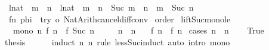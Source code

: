 \begin{isabellebody}
\ \ {\isacharparenleft}{\kern0pt}{\isachardoublequoteopen}{\isacharparenleft}{\kern0pt}l{\isacharcolon}{\kern0pt}{\isacharcolon}{\kern0pt}nat{\isacharparenright}{\kern0pt}\ {\isacharplus}{\kern0pt}\ m\ {\isacharminus}{\kern0pt}\ n{\isachardoublequoteclose}\ {\isacharbar}{\kern0pt}\ {\isachardoublequoteopen}{\isacharparenleft}{\kern0pt}l{\isacharcolon}{\kern0pt}{\isacharcolon}{\kern0pt}nat{\isacharparenright}{\kern0pt}\ {\isacharminus}{\kern0pt}\ {\isacharparenleft}{\kern0pt}m\ {\isacharplus}{\kern0pt}\ n{\isacharparenright}{\kern0pt}{\isachardoublequoteclose}\ {\isacharbar}{\kern0pt}\ {\isachardoublequoteopen}Suc\ m\ {\isacharminus}{\kern0pt}\ n{\isachardoublequoteclose}\ {\isacharbar}{\kern0pt}\ {\isachardoublequoteopen}m\ {\isacharminus}{\kern0pt}\ Suc\ n{\isachardoublequoteclose}{\isacharparenright}{\kern0pt}\ {\isacharequal}{\kern0pt}\isanewline
\ \ {\isacartoucheopen}fn\ phi\ {\isacharequal}{\kern0pt}{\isachargreater}{\kern0pt}\ try\ o\ Nat{\isacharunderscore}{\kern0pt}Arith{\isachardot}{\kern0pt}cancel{\isacharunderscore}{\kern0pt}diff{\isacharunderscore}{\kern0pt}conv{\isacartoucheclose}%
\endisatagML
{\isafoldML}%
%
\isadelimML
\isanewline
%
\endisadelimML
\isanewline
{}\isamarkupfalse%
\ order\isanewline
{}\isanewline
\isanewline
{}\isamarkupfalse%
\ lift{\isacharunderscore}{\kern0pt}Suc{\isacharunderscore}{\kern0pt}mono{\isacharunderscore}{\kern0pt}le{\isacharcolon}{\kern0pt}\isanewline
\ \ \ mono{\isacharcolon}{\kern0pt}\ {\isachardoublequoteopen}{\isasymAnd}n{\isachardot}{\kern0pt}\ f\ n\ {\isasymle}\ f\ {\isacharparenleft}{\kern0pt}Suc\ n{\isacharparenright}{\kern0pt}{\isachardoublequoteclose}\isanewline
\ \ \ \ \ {\isachardoublequoteopen}n\ {\isasymle}\ n{\isacharprime}{\kern0pt}{\isachardoublequoteclose}\isanewline
\ \ \ {\isachardoublequoteopen}f\ n\ {\isasymle}\ f\ n{\isacharprime}{\kern0pt}{\isachardoublequoteclose}\isanewline
%
\isadelimproof
%
\endisadelimproof
%
\isatagproof
{}\isamarkupfalse%
\ {\isacharparenleft}{\kern0pt}cases\ {\isachardoublequoteopen}n\ {\isacharless}{\kern0pt}\ n{\isacharprime}{\kern0pt}{\isachardoublequoteclose}{\isacharparenright}{\kern0pt}\isanewline
\ \ \isamarkupfalse%
\ True\isanewline
\ \ \isamarkupfalse%
\ \isamarkupfalse%
\ {\isacharquery}{\kern0pt}thesis\isanewline
\ \ \ \ \isamarkupfalse%
\ {\isacharparenleft}{\kern0pt}induct\ n\ n{\isacharprime}{\kern0pt}\ rule{\isacharcolon}{\kern0pt}\ less{\isacharunderscore}{\kern0pt}Suc{\isacharunderscore}{\kern0pt}induct{\isacharparenright}{\kern0pt}\ {\isacharparenleft}{\kern0pt}auto\ intro{\isacharcolon}{\kern0pt}\ mono{\isacharparenright}{\kern0pt}\isanewline

\end{isabellebody}

